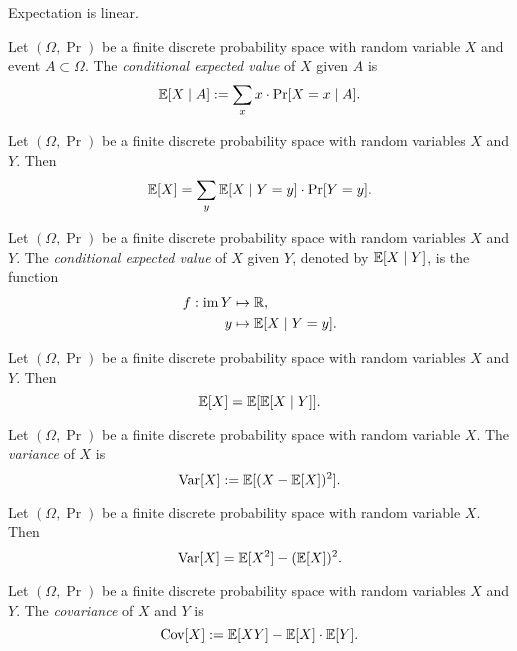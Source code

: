 \begin{lemma}
    Expectation is linear.
\end{lemma}

\begin{definition}
    Let $(\Omega, \Pr)$ be a finite discrete probability space with random variable $X$ and event $A \subset \Omega$. The \emph{conditional expected value} of $X$ given $A$ is
    \[ \mathbb E[X \mid A] := \sum_{x} x \cdot \Pr[X = x \mid A]. \]
\end{definition}

\begin{proposition}
    Let $(\Omega, \Pr)$ be a finite discrete probability space with random variables $X$ and $Y$. Then 
    \[ \mathbb E[X] = \sum_y \mathbb E[X \mid Y = y] \cdot \Pr[Y = y]. \]
\end{proposition}

\begin{definition}
    Let $(\Omega, \Pr)$ be a finite discrete probability space with random variables $X$ and $Y$. The \emph{conditional expected value} of $X$ given $Y$, denoted by $\mathbb E[X \mid Y]$, is the function
    \begin{align*}
        f: \operatorname{im} Y &\mapsto \mathbb R, \\
        y &\mapsto \mathbb E[X \mid Y = y].
    \end{align*}
\end{definition}

\begin{proposition}
    Let $(\Omega, \Pr)$ be a finite discrete probability space with random variables $X$ and $Y$. Then
    \[ \mathbb E[X] = \mathbb E[\mathbb E[X \mid Y]]. \]
\end{proposition}

\begin{definition}[Variance]
    Let $(\Omega, \Pr)$ be a finite discrete probability space with random variable $X$. The \emph{variance} of $X$ is
    \[ \operatorname{Var}[X] := \mathbb E[(X - \mathbb E[X])^2]. \]
\end{definition}

\begin{proposition}
    Let $(\Omega, \Pr)$ be a finite discrete probability space with random variable $X$. Then 
    \[ \operatorname{Var}[X] = \mathbb E[X^2] - (\mathbb E[X])^2. \]
\end{proposition}

\begin{definition}[Covariance]
    Let $(\Omega, \Pr)$ be a finite discrete probability space with random variables $X$ and $Y$. The \emph{covariance} of $X$ and $Y$ is
    \[ \operatorname{Cov}[X] := \mathbb E[XY] - \mathbb E[X] \cdot \mathbb E[Y]. \]
\end{definition}

